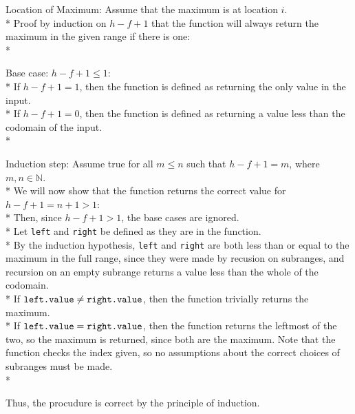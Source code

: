 \documentclass[letterpaper, reqno, 11pt]{article}
\newcommand{\NN}{\mathbb{N}}
\begin{document}
\begin{description}
	\item{Location of Maximum:}
	Assume that the maximum is at location $i$.\\*
	Proof by induction on $h-f+1$
	that the function will always return the maximum in the given range if there is one:\\*
	\begin{description}
		\item{Base case:} $h-f+1\leq1$:\\*
		If $h-f+1=1$,
		then the function is defined as returning the only value in the input.\\*
		If $h-f+1=0$,
		then the function is defined as returning
		a value less than the codomain of the input.\\*
		\item{Induction step:} Assume true for all $m\leq n$ such that $h-f+1=m$, where $m,n\in\NN$.\\*
		We will now show that the function returns the correct value for $h-f+1=n+1>1$:\\*
		Then, since $h-f+1>1$, the base cases are ignored.\\*
		Let \verb|left| and \verb|right| be defined as they are in the function.\\*
		By the induction hypothesis, \verb|left| and \verb|right| are both less than or equal
		to the maximum in the full range, since they were made by recusion on subranges,
		and recursion on an empty subrange returns a value less than the whole of the codomain.\\*
		If $\verb|left.value|\neq\verb|right.value|$, then the function trivially returns the maximum.\\*
		If $\verb|left.value|=\verb|right.value|$, then the function returns the leftmost of the two,
		so the maximum is returned, since both are the maximum.
		Note that the function checks the index given, so no assumptions about the correct choices
		of subranges must be made.\\*
	\end{description}
	Thus, the procudure is correct by the principle of induction.


\end{description}
\end{document}
